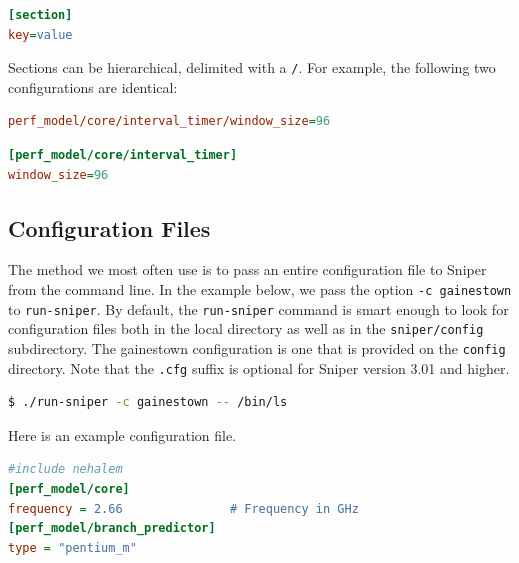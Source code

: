 \documentclass[a4paper,11pt,titlepage]{article}
\newcommand{\sourcecode}[1]{{\tt #1}}
\newcommand{\cmd}[1]{{\tt #1}}
\begin{document}
\begin{lstlisting}[label=lst:config-key-value-configfile,caption=Key Value and Section for Config Files,rulecolor=\color{DarkSlateBlue},language=ini]
[section]
key=value
\end{lstlisting}

Sections can be hierarchical, delimited with a \sourcecode{/}.  For example, the following two configurations are identical:

\begin{lstlisting}[label=lst:config-key-value,caption=Hierarchical Section Configuration,rulecolor=\color{DarkSlateBlue},language=ini]
perf_model/core/interval_timer/window_size=96
\end{lstlisting}

\begin{lstlisting}[label=lst:config-key-value,caption=Hierarchical Section Config File,rulecolor=\color{DarkSlateBlue},language=ini]
[perf_model/core/interval_timer]
window_size=96
\end{lstlisting}


\subsection{Configuration Files}
\label{configuration-files}

The method we most often use is to pass an entire configuration file to Sniper from the command line.  In the example
below, we pass the option \cmd{-c gainestown} to \cmd{run-sniper}.  By default, the \cmd{run-sniper} command is smart enough
to look for configuration files both in the local directory as well as in the \cmd{sniper/config} subdirectory.  The gainestown
configuration is one that is provided on the \cmd{config} directory.  Note that the \cmd{.cfg} suffix is optional for Sniper version 3.01 and higher.

\begin{lstlisting}[label=lst:options-files,caption=Passing Options via the Command Line,rulecolor=\color{DarkSlateBlue},language=Bash]
$ ./run-sniper -c gainestown -- /bin/ls
\end{lstlisting}

Here is an example configuration file.
\begin{lstlisting}[label=lst:config-file-example,caption=Example configuration file,rulecolor=\color{DarkSlateBlue},language=ini]
#include nehalem
[perf_model/core]
frequency = 2.66               # Frequency in GHz
[perf_model/branch_predictor]
type = "pentium_m"
\end{lstlisting}
\end{document}
